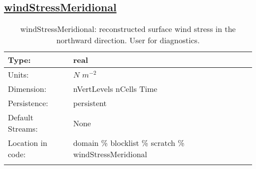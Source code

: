 \subsection[windStressMeridional]{\hyperref[sec:var_tab_scratch]{windStressMeridional}}
\label{subsec:var_sec_scratch_windStressMeridional}
\begin{center}
\begin{longtable}{| p{2.0in} | p{4.0in} |}
        \hline 
        Type: & real \\
        \hline 
        Units: & $N$ $m^{-2}$ \\
        \hline 
        Dimension: & nVertLevels nCells Time \\
        \hline 
        Persistence: & persistent \\
        \hline 
		 Default Streams: & None \\
        \hline 
		 Location in code: & domain \% blocklist \% scratch \% windStressMeridional \\
		 \hline 
    \caption{windStressMeridional: reconstructed surface wind stress in the northward direction. User for diagnostics.}
\end{longtable}
\end{center}
